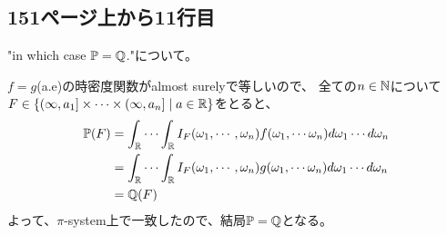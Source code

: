   \subsection{151ページ上から11行目}
    "in which case ${\mathbb{P}} = {\mathbb{Q}}$."について。

    $f = g$(a.e)の時密度関数がalmost surelyで等しいので、
    全ての$n \in {\mathbb{N}}$について
    $F \in \{(\infty,a_1] \times \cdots \times (\infty,a_n] \mid a \in {\mathbb{R}}\}$をとると、
    \begin{align*}
      {\mathbb{P}}(F) &= \int_{{\mathbb{R}}}\cdots \int_{{\mathbb{R}}}I_F(\omega_1,\cdots ,\omega_n)f(\omega_1,\cdots \omega_n)d\omega_1 \cdots d\omega_n\\
      &= \int_{{\mathbb{R}}} \cdots \int_{{\mathbb{R}}}I_F(\omega_1,\cdots ,\omega_n)g(\omega_1,\cdots \omega_n)d\omega_1 \cdots d\omega_n\\
      &= {\mathbb{Q}}(F)
    \end{align*}
    よって、$\pi$-system上で一致したので、結局${\mathbb{P}} = {\mathbb{Q}}$となる。
